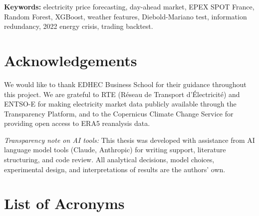 \documentclass[12pt, a4paper, oneside]{report}
\begin{document}
\vspace{1em}
\noindent\textbf{Keywords:} electricity price forecasting, day-ahead market,
EPEX SPOT France, Random Forest, XGBoost, weather features, Diebold-Mariano
test, information redundancy, 2022 energy crisis, trading backtest.

\chapter*{Acknowledgements}

We would like to thank EDHEC Business School for their guidance throughout this project. We are grateful to RTE (R\'{e}seau de Transport d'Électricit\'{e}) and ENTSO-E for making electricity market data publicly available through the Transparency Platform, and to the Copernicus Climate Change Service for providing open access to ERA5 reanalysis data.

\medskip
\noindent\textit{Transparency note on AI tools:} This thesis was developed with assistance from AI language model tools (Claude, Anthropic) for writing support, literature structuring, and code review. All analytical decisions, model choices, experimental design, and interpretations of results are the authors' own.

\tableofcontents
\listoffigures
\listoftables

\chapter*{List of Acronyms}
\begin{acronym}
\end{acronym}
\end{document}

